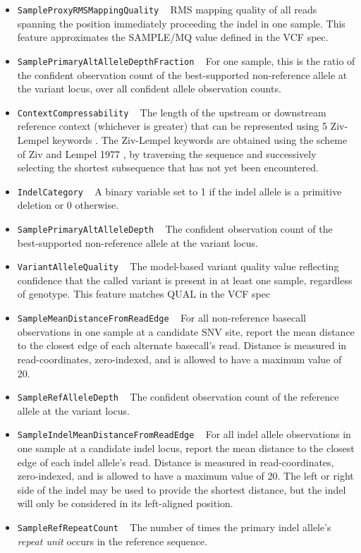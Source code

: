 \documentclass{article}
\begin{document}
\begin{itemize}
    \item \texttt{SampleProxyRMSMappingQuality} ~ RMS mapping quality of all reads spanning the position immediately proceeding the indel in one sample. This feature approximates the SAMPLE/MQ value defined in the VCF spec.

    \item \texttt{SamplePrimaryAltAlleleDepthFraction} ~ For one sample, this is the ratio of the confident observation count of the best-supported non-reference allele at the variant locus, over all confident allele observation counts.

    \item \texttt{ContextCompressability} ~ The length of the upstream or downstream reference context (whichever is greater) that can be represented using 5 Ziv-Lempel keywords \cite{lesne2009,ziv1977}. The Ziv-Lempel keywords are obtained using the scheme of Ziv and Lempel 1977 \cite{ziv1977}, by traversing the sequence and successively selecting the shortest subsequence that has not yet been encountered.

    \item \texttt{IndelCategory} ~ A binary variable set to 1 if the indel allele is a primitive deletion or 0 otherwise.

    \item \texttt{SamplePrimaryAltAlleleDepth} ~ The confident observation count of the best-supported non-reference allele at the variant locus.

    \item \texttt{VariantAlleleQuality} ~ The model-based variant quality value reflecting confidence that the called variant is present in at least one sample, regardless of genotype. This feature matches QUAL in the VCF spec

    \item \texttt{SampleMeanDistanceFromReadEdge} ~ For all non-reference basecall observations in one sample at a candidate SNV site, report the mean distance to the closest edge of each alternate basecall's read. Distance is measured in read-coordinates, zero-indexed, and is allowed to have a maximum value of 20.

    \item \texttt{SampleRefAlleleDepth} ~ The confident observation count of the reference allele at the variant locus.

    \item \texttt{SampleIndelMeanDistanceFromReadEdge} ~ For all indel allele observations in one sample at a candidate indel locus, report the mean distance to the closest edge of each indel allele's read. Distance is measured in read-coordinates, zero-indexed, and is allowed to have a maximum value of 20. The left or right side of the indel may be used to provide the shortest distance, but the indel will only be considered in its left-aligned position.

    \item \texttt{SampleRefRepeatCount} ~ The number of times the primary indel allele's \emph{repeat unit} occurs in the reference sequence.

\end{itemize}
\end{document}
